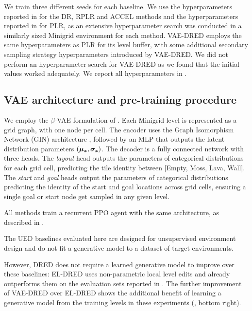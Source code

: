 We train three different seeds for each baseline. We use the hyperparameters reported in \cite{ACCEL} for the DR, RPLR and ACCEL methods and the hyperparameters reported in \cite{PLR} for PLR, as an extensive hyperparameter search was conducted in a similarly sized Minigrid environment for each method. VAE-DRED employs the same hyperparameters as PLR for its level buffer, with some additional secondary sampling strategy hyperparameters introduced by VAE-DRED. We did not perform an hyperparameter search for VAE-DRED as we found that the initial values worked adequately. We report all hyperparameters in .

\subsection{VAE architecture and pre-training procedure}\label{c3:app:vae_imp}

We employ the $\beta$-VAE formulation of \citet{betaVAE}. Each Minigrid level is represented as a grid graph, with one node per cell. The encoder uses the Graph Isomorphism Network (GIN) architecture \citep{GIN}, followed by an MLP that outputs the latent distribution parameters $({\bm{\mu}}_{\bm{z}}, {\bm{\sigma}}_{\bm{z}})$. The decoder is a fully connected network with three heads. The \textit{layout} head outputs the parameters of categorical distributions for each grid cell, predicting the tile identity between [Empty, Moss, Lava, Wall]. The \textit{start} and \textit{goal} heads output the parameters of categorical distributions predicting the identity of the start and goal locations across grid cells, ensuring a single goal or start node get sampled in any given level.

All methods train a recurrent PPO agent with the same architecture, as described in .

The UED baselines evaluated here are designed for unsupervised environment design and do not fit a generative model to a dataset of target environments.

However, DRED does not require a learned generative model to improve over these baselines: EL-DRED uses non-parametric local level edits and already outperforms them on the evaluation sets reported in . The further improvement of VAE-DRED over EL-DRED shows the additional benefit of learning a generative model from the training levels in these experiments (, bottom right).

